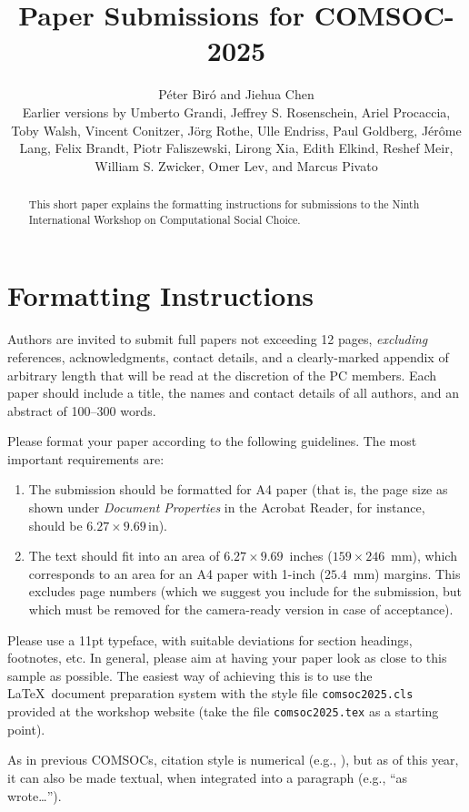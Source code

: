 \documentclass{comsoc2025}
\title{Paper Submissions for COMSOC-2025}
\author{P{\'e}ter Bir{\'o} and Jiehua Chen\\
\footnotesize{Earlier versions by Umberto Grandi, Jeffrey S. Rosenschein, Ariel Procaccia, Toby Walsh, Vincent Conitzer, J\"org Rothe, Ulle Endriss, Paul Goldberg, J\'er\^ome Lang, Felix Brandt, Piotr Faliszewski, Lirong Xia, Edith Elkind, Reshef Meir, William S. Zwicker, Omer Lev, and Marcus Pivato}}
\begin{document}

\begin{abstract}
 This short paper explains the formatting instructions for submissions to the Ninth International Workshop on Computational Social Choice.
\end{abstract}


\section{Formatting Instructions}

Authors are invited to submit full papers not exceeding 12 pages, \emph{excluding} references, acknowledgments, contact details, and a clearly-marked appendix of arbitrary length that will be read at the discretion of the PC members. Each paper should include a title, the names and contact details of all authors, and an abstract of 100--300 words.

Please format your paper according to the following guidelines. The most important requirements are:
\begin{enumerate}
\item The submission should be formatted for A4 paper (that is, the page size as shown under \emph{Document Properties} in the Acrobat Reader, for instance, should be $6.27\times 9.69\,\mbox{in}$).
\item The text should fit into an area of $6.27 \times 9.69$~inches ($159 \times 246$~mm), which corresponds to an area for an A4 paper with 1-inch ($25.4$~mm) margins. 
This excludes page numbers (which we suggest you include for the submission, but which must be removed for the camera-ready version in case of acceptance).
\end{enumerate}

Please use a 11pt typeface, with suitable deviations for section headings, footnotes, etc. In general, please aim at having your paper look as close to this sample as possible. The easiest way of achieving this is to use the \LaTeX\ document preparation system with the style file \texttt{comsoc2025.cls} provided at the workshop website (take the file \texttt{comsoc2025.tex} as a starting point). 

As in previous COMSOCs, citation style is numerical (e.g., \cite{bra-con-end-lan-pro:b:handbook-comsoc}), but as of this year, it can also be made textual, when integrated into a paragraph (e.g., ``as \citet{rot:b-2nd-edition:economics-and-computation} wrote\ldots'').
\end{document}
